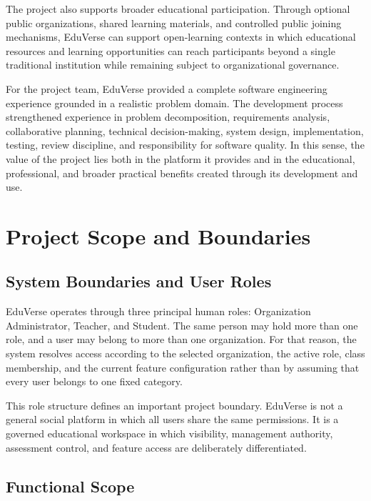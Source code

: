 The project also supports broader educational participation. Through optional
public organizations, shared learning materials, and controlled public joining
mechanisms, EduVerse can support open-learning contexts in which educational
resources and learning opportunities can reach participants beyond a single
traditional institution while remaining subject to organizational governance.

For the project team, EduVerse provided a complete software engineering
experience grounded in a realistic problem domain. The development process
strengthened experience in problem decomposition, requirements analysis,
collaborative planning, technical decision-making, system design,
implementation, testing, review discipline, and responsibility for software
quality. In this sense, the value of the project lies both in the platform it
provides and in the educational, professional, and broader practical benefits
created through its development and use.

\section{Project Scope and Boundaries}\label{sec:project_scope}
\subsection{System Boundaries and User Roles}\label{subsec:system_boundaries_roles}

EduVerse operates through three principal human roles: Organization
Administrator, Teacher, and Student. The same person may hold more than one
role, and a user may belong to more than one organization. For that reason, the
system resolves access according to the selected organization, the active role,
class membership, and the current feature configuration rather than by assuming
that every user belongs to one fixed category.

This role structure defines an important project boundary. EduVerse is not a
general social platform in which all users share the same permissions. It is a
governed educational workspace in which visibility, management authority,
assessment control, and feature access are deliberately differentiated.

\subsection{Functional Scope}\label{subsec:functional_scope}


